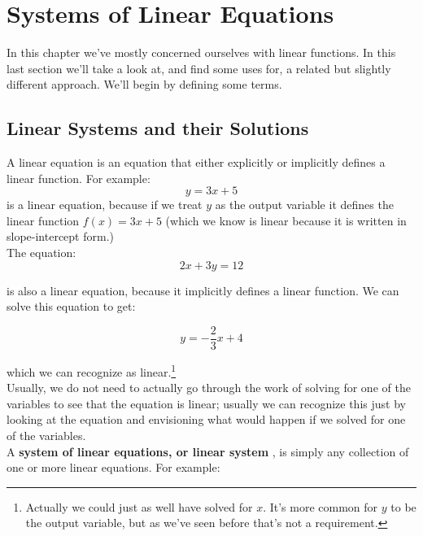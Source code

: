 %
%

\section{Systems of Linear Equations}
\label{SystemsofLinearEquations}

In this chapter we’ve mostly concerned ourselves with linear functions. In this last section we’ll take a look at, and find some uses for, a related but slightly different approach. We’ll begin by
defining some terms.

%
%

\subsection{Linear Systems and their Solutions}

A linear equation is an equation that either explicitly or implicitly defines a linear function. For example:$$y=3x+5$$
is a linear equation, because if we treat $y$ as the output variable it defines the linear function $f(x)=3x+5$ (which we know is linear because it is written in slope-intercept form.)\\

The equation:$$2x+3y=12$$

is also a linear equation, because it implicitly defines a linear function. We can solve this equation to get:

$$y=-\frac{2}{3}x+4$$

which we can recognize as linear.\footnote{Actually we could just as well have solved for $x$. It’s more common for $y$ to be the output variable, but as we’ve seen before that’s not a requirement.}\\

Usually, we do not need to actually go through the work of solving for one of the variables to see that the equation is linear; usually we can recognize this just by looking at the equation and envisioning what would happen if we solved for one of the variables.\\

A \textbf{system of linear equations, or linear system} , is simply any collection of one or more linear equations. For example:

